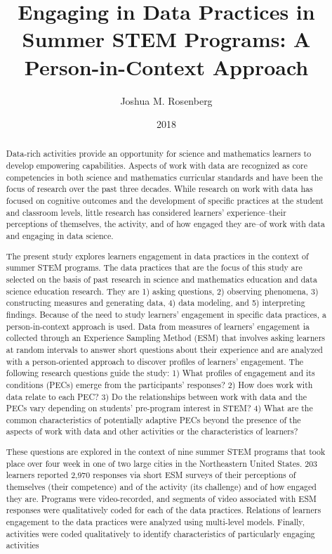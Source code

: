 \documentclass[]{msu-thesis}
\title{Engaging in Data Practices in Summer STEM Programs: A Person-in-Context Approach
}
\author{Joshua M. Rosenberg}
\date{2018}
\theoremstyle{definition}
\theoremstyle{definition}
\theoremstyle{definition}
\theoremstyle{remark}
\begin{document}

\maketitlepage
\begin{abstract}
Data-rich activities provide an opportunity for science and mathematics learners to develop empowering capabilities. Aspects of work with data are recognized as core competencies in both science and mathematics curricular standards and have been the focus of research over the past three decades. While research on work with data has focused on cognitive outcomes and the development of specific practices at the student and classroom levels, little research has considered learners' experience--their perceptions of themselves, the activity, and of how engaged they are--of work with data and engaging in data science.

The present study explores learners engagement in data practices in the context of summer STEM programs. The data practices that are the focus of this study are selected on the basis of past research in science and mathematics education and data science education research. They are 1) asking questions, 2) observing phenomena, 3) constructing measures and generating data, 4) data modeling, and 5) interpreting findings. Because of the need to study learners' engagement in specific data practices, a person-in-context approach is used. Data from measures of learners' engagement ia collected through an Experience Sampling Method (ESM) that involves asking learners at random intervals to answer short questions about their experience and are analyzed with a person-oriented approach to discover profiles of learners' engagement. The following research questions guide the study: 1) What profiles of engagement and its conditions (PECs) emerge from the participants’ responses? 2) How does work with data relate to each PEC? 3) Do the relationships between work with data and the PECs vary depending on students’ pre-program interest in STEM? 4) What are the common characteristics of potentially adaptive PECs beyond the presence of the aspects of work with data and other activities or the characteristics of learners?

These questions are explored in the context of nine summer STEM programs that took place over four week in one of two large cities in the Northeastern United States. 203 learners reported 2,970 responses via short ESM surveys of their perceptions of themselves (their competence) and of the activity (its challenge) and of how engaged they are. Programs were video-recorded, and segments of video associated with ESM responses were qualitatively coded for each of the data practices. Relations of learners engagement to the data practices were analyzed using multi-level models. Finally, activities were coded qualitatively to identify characteristics of particularly engaging activities


\end{abstract}
\end{document}
